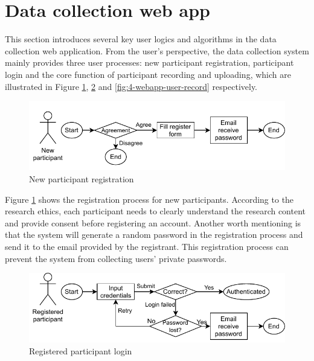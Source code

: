 \section{Data collection web app}
\label{sec:Data collection web app}
This section introduces several key user logics and algorithms in the data collection web application.
From the user's perspective, the data collection system mainly provides three user processes: new participant registration, participant login and the core function of participant recording and uploading, which are illustrated in Figure \ref{fig:4-webapp-user-register}, \ref{fig:4-webapp-user-login} and \ref{fig:4-webapp-user-record} respectively.

\begin{figure}[!ht]
    \centering
    \includegraphics[width=\textwidth]{implementation/imgs/4-webapp-user-register.pdf}
    \caption{New participant registration}
    \label{fig:4-webapp-user-register}
\end{figure}

Figure \ref{fig:4-webapp-user-register} shows the registration process for new participants.
According to the research ethics, each participant needs to clearly understand the research content and provide consent before registering an account.
Another worth mentioning is that the system will generate a random password in the registration process and send it to the email provided by the registrant.
This registration process can prevent the system from collecting users' private passwords.

\begin{figure}[!ht]
    \centering
    \includegraphics[width=\textwidth]{implementation/imgs/4-webapp-user-login.pdf}
    \caption{Registered participant login}
    \label{fig:4-webapp-user-login}
\end{figure}

